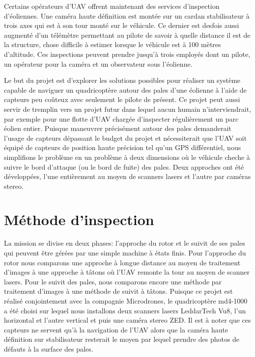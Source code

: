 Certains opérateurs d'UAV offrent maintenant des services d'inspection d'éoliennes. Une caméra haute définition est montée sur un cardan stabilisateur à trois axes qui est à son tour monté sur le véhicule. Ce dernier est desfois aussi augmenté d'un télémètre permettant au pilote de savoir à quelle distance il est de la structure, chose difficile à estimer lorsque le véhicule est à 100 mètres d'altitude. Ces inspections peuvent prendre jusqu'à trois employés dont un pilote, un opérateur pour la caméra et un observateur sous l'éolienne.

Le but du projet est d'explorer les solutions possibles pour réaliser un système capable de naviguer un quadricoptère autour des pales d'une éolienne à l'aide de capteurs peu coûteux avec seulement le pilote de présent. Ce projet peut aussi servir de tremplin vers un projet futur dans lequel aucun humain n'interviendrait, par exemple pour une flotte d'UAV chargée d'inspecter régulièrement un parc éolien entier. Puisque maneuvrer précisément autour des pales demanderait l'usage de capteurs dépassant le budget du projet et nécessiterait que l'UAV soit équipé de capteurs de position haute précision tel qu'un GPS différentiel, nous simplifions le problème en un problème à deux dimensions où le véhicule cheche à suivre le bord d'attaque (ou le bord de fuite) des pales. Deux approches ont été développées, l'une entièrement au moyen de scanners lasers et l'autre par caméras stereo.

\section{Méthode d'inspection}

La mission se divise en deux phases: l'approche du rotor et le suivit de ses pales qui peuvent être gérées par une simple machine à états finis. Pour l'approche du rotor nous comparons une approche à longue distance au moyen de traitement d'images à une approche à tâtons où l'UAV remonte la tour au moyen de scanner lasers. Pour le suivit des pales, nous comparons encore une méthode par traitement d'images à une méthode de suivit à tâtons. Puisque ce projet est réalisé conjointement avec la compagnie Microdrones, le quadricoptère md4-1000 a été choisi sur lequel nous installons deux scanners lasers LeddarTech Vu8, l'un horizontal et l'autre vertical et puis une caméra stereo ZED. Il est à noter que ces capteurs ne servent qu'à la navigation de l'UAV alors que la caméra haute définition sur stabilisateur resterait le moyen par lequel prendre des photos de défauts à la surface des pales.

